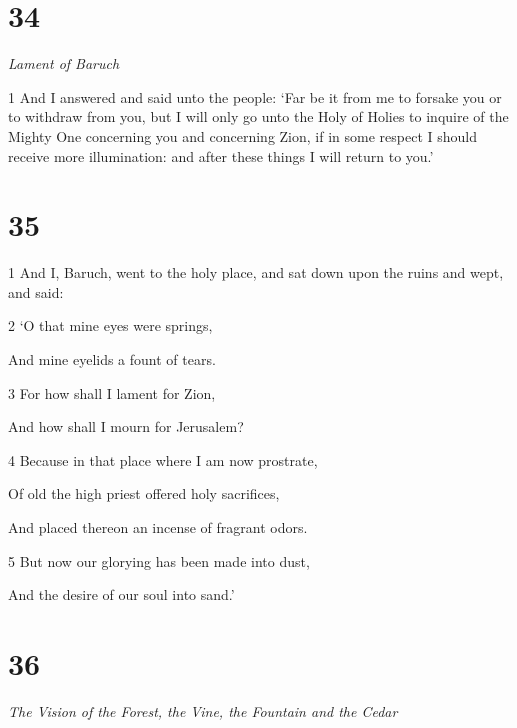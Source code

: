 \chapter{34}

\par \textit{Lament of Baruch}

\par 1 And I answered and said unto the people: ‘Far be it from me to forsake you or to withdraw from you, but I will only go unto the Holy of Holies to inquire of the Mighty One concerning you and concerning Zion, if in some respect I should receive more illumination: and after these things I will return to you.’

\chapter{35}

\par 1 And I, Baruch, went to the holy place, and sat down upon the ruins and wept, and said:

\par 2 ‘O that mine eyes were springs,

\par And mine eyelids a fount of tears.

\par 3 For how shall I lament for Zion,

\par And how shall I mourn for Jerusalem?

\par 4 Because in that place where I am now prostrate,

\par Of old the high priest offered holy sacrifices,

\par And placed thereon an incense of fragrant odors.

\par 5 But now our glorying has been made into dust,

\par And the desire of our soul into sand.’

\chapter{36}

\par \textit{The Vision of the Forest, the Vine, the Fountain and the Cedar}

